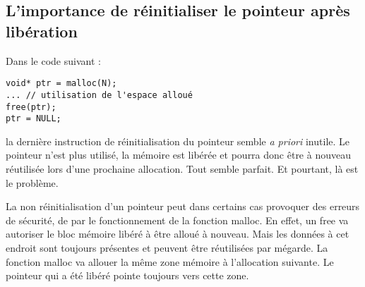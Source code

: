 \documentclass[../../../main.tex]{subfiles}
\begin{document}
\subsection{L'importance de réinitialiser le pointeur après libération}
Dans le code suivant :
\begin{verbatim}
void* ptr = malloc(N);
... // utilisation de l'espace alloué
free(ptr);
ptr = NULL;
\end{verbatim}
la dernière instruction de réinitialisation du pointeur semble \textit{a priori} inutile. Le pointeur n'est plus utilisé, la mémoire est libérée et pourra donc être à nouveau réutilisée lors d'une prochaine allocation. Tout semble parfait. Et pourtant, là est le problème.

La non réinitialisation d'un pointeur peut dans certains cas provoquer des erreurs de sécurité, de par le fonctionnement de la fonction \textsf{malloc}. En effet, un \textsf{free} va autoriser le bloc mémoire libéré à être alloué à nouveau. Mais les données à cet endroit sont toujours présentes et peuvent être réutilisées par mégarde. La fonction \textsf{malloc} va allouer la même zone mémoire à l'allocation suivante. Le pointeur qui a été libéré pointe toujours vers cette zone.
\end{document}
